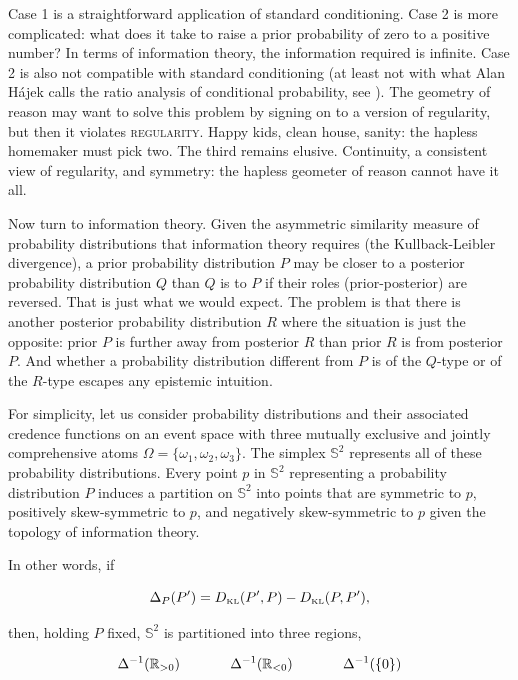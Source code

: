 \documentclass[12pt]{article}
\begin{document}
Case 1 is a straightforward application of standard conditioning. Case
2 is more complicated: what does it take to raise a prior probability
of zero to a positive number? In terms of information theory, the
information required is infinite. Case 2 is also not compatible with
standard conditioning (at least not with what Alan H{\'a}jek calls the
ratio analysis of conditional probability, see ).
The geometry of reason may want to solve this problem by signing on to
a version of regularity, but then it violates \textsc{regularity}.
Happy kids, clean house, sanity: the hapless homemaker must pick two.
The third remains elusive. Continuity, a consistent view of
regularity, and symmetry: the hapless geometer of reason cannot have
it all.

Now turn to information theory. Given the asymmetric similarity
measure of probability distributions that information theory requires
(the Kullback-Leibler divergence), a prior probability distribution
$P$ may be closer to a posterior probability distribution $Q$ than $Q$
is to $P$ if their roles (prior-posterior) are reversed. That is just
what we would expect. The problem is that there is another posterior
probability distribution $R$ where the situation is just the opposite:
prior $P$ is further away from posterior $R$ than prior $R$ is from
posterior $P$. And whether a probability distribution different from
$P$ is of the $Q$-type or of the $R$-type escapes any epistemic
intuition.

For simplicity, let us consider probability distributions and their
associated credence functions on an event space with three mutually
exclusive and jointly comprehensive atoms
$\Omega=\{\omega_{1},\omega_{2},\omega_{3}\}$. The simplex
$\mathbb{S}^{2}$ represents all of these probability distributions.
Every point $p$ in $\mathbb{S}^{2}$ representing a probability
distribution $P$ induces a partition on $\mathbb{S}^{2}$ into points
that are symmetric to $p$, positively skew-symmetric to $p$, and
negatively skew-symmetric to $p$ given the topology of information
theory.

In other words, if

\begin{equation}
  \label{eq:sksy}
  \Delta_{P}(P')=D_{\mbox{\tiny KL}}(P',P)-D_{\mbox{\tiny KL}}(P,P'),
\end{equation}

then, holding $P$ fixed, $\mathbb{S}^{2}$ is partitioned into three
regions, 

\begin{equation}
  \label{eq:sieruxis}
  \Delta^{-1}(\mathbb{R}_{>0})\hspace{.5in}\Delta^{-1}(\mathbb{R}_{<0})\hspace{.5in}\Delta^{-1}(\{0\})
\end{equation}
\end{document}
